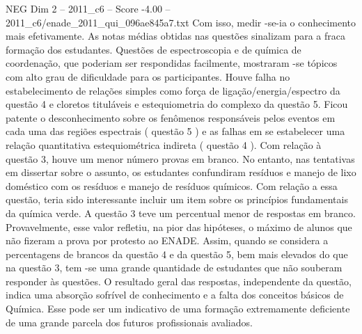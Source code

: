 \begin{textsample}{NEG Dim 2 – 2011\_c6 – Score -4.00 – 2011\_c6/enade\_2011\_qui\_096ae845a7.txt}
Com isso, medir -se-ia o conhecimento mais efetivamente.
As notas médias obtidas nas questões sinalizam para a fraca formação dos estudantes.
Questões de espectroscopia e de química de coordenação, que poderiam ser respondidas facilmente, mostraram -se tópicos com alto grau de dificuldade para os participantes.
Houve falha no estabelecimento de relações simples como força de ligação/energia/espectro da questão 4 e cloretos tituláveis e estequiometria do complexo da questão 5.
Ficou patente o desconhecimento sobre os fenômenos responsáveis pelos eventos em cada uma das regiões espectrais ( questão 5 ) e as falhas em se estabelecer uma relação quantitativa estequiométrica indireta ( questão 4 ).
Com relação à questão 3, houve um menor número provas em branco.
No entanto, nas tentativas em dissertar sobre o assunto, os estudantes confundiram resíduos e manejo de lixo doméstico com os resíduos e manejo de resíduos químicos.
Com relação a essa questão, teria sido interessante incluir um item sobre os princípios fundamentais da química verde.
A questão 3 teve um percentual menor de respostas em branco.
Provavelmente, esse valor refletiu, na pior das hipóteses, o máximo de alunos que não fizeram a prova por protesto ao ENADE.
Assim, quando se considera a percentagens de brancos da questão 4 e da questão 5, bem mais elevados do que na questão 3, tem -se uma grande quantidade de estudantes que não souberam responder às questões.
O resultado geral das respostas, independente da questão, indica uma absorção sofrível de conhecimento e a falta dos conceitos básicos de Química.
Esse pode ser um indicativo de uma formação extremamente deficiente de uma grande parcela dos futuros profissionais avaliados.

\end{textsample}
